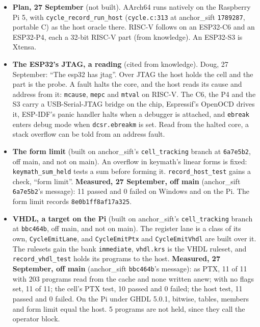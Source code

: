 \begin{enumerate}
\begin{itemize}
\begin{enumerate}
\begin{itemize}
\item \textbf{Plan, 27 September} (not built). AArch64 runs natively on the Raspberry Pi 5, with \texttt{cycle\_\allowbreak{}record\_\allowbreak{}run\_\allowbreak{}host} (\texttt{cycle.\allowbreak{}c:313} at anchor\_\allowbreak{}sift \texttt{1789287}, portable C) as the host oracle there. RISC-V follows on an ESP32-C6 and an ESP32-P4, each a 32-bit RISC-V part (from knowledge). An ESP32-S3 is Xtensa.
\item \textbf{The ESP32's JTAG, a reading} (cited from knowledge). Doug, 27 September: “The esp32 has jtag”. Over JTAG the host holds the cell and the part is the probe. A fault halts the core, and the host reads its cause and address from it: \texttt{mcause}, \texttt{mepc} and \texttt{mtval} on RISC-V. The C6, the P4 and the S3 carry a USB-Serial-JTAG bridge on the chip, Espressif's OpenOCD drives it, ESP-IDF's panic handler halts when a debugger is attached, and \texttt{ebreak} enters debug mode when \texttt{dcsr.ebreakm} is set. Read from the halted core, a stack overflow can be told from an address fault.
\item \textbf{The form limit} (built on anchor\_\allowbreak{}sift's \texttt{cell\_\allowbreak{}tracking} branch at \texttt{6a7e5b2}, off main, and not on main). An overflow in keymath's linear forms is fixed: \texttt{keymath\_\allowbreak{}sum\_\allowbreak{}held} tests a sum before forming it. \texttt{record\_\allowbreak{}host\_\allowbreak{}test} gains a check, “form limit”. \textbf{Measured, 27 September, off main} (anchor\_\allowbreak{}sift \texttt{6a7e5b2}'s message): 11 passed and 0 failed on Windows and on the Pi. The form limit records \texttt{8e0b1ff8af17a325}.
\item \textbf{VHDL, a target on the Pi} (built on anchor\_\allowbreak{}sift's \texttt{cell\_\allowbreak{}tracking} branch at \texttt{bbc464b}, off main, and not on main). The register lane is a class of its own, \texttt{CycleEmitLane}, and \texttt{CycleEmitPtx} and \texttt{CycleEmitVhdl} are built over it. The rulesets gain the bank \texttt{immediate}, \texttt{vhdl.\allowbreak{}krs} is the VHDL ruleset, and \texttt{record\_\allowbreak{}vhdl\_\allowbreak{}test} holds its programs to the host. \textbf{Measured, 27 September, off main} (anchor\_\allowbreak{}sift \texttt{bbc464b}'s message): as PTX, 11 of 11 with 203 programs read from the cache and none written anew; with no flags set, 11 of 11; the cell's PTX test, 10 passed and 0 failed; the host test, 11 passed and 0 failed. On the Pi under GHDL 5.0.1, bitwise, tables, members and form limit equal the host. 5 programs are not held, since they call the operator block.


\end{itemize}
\end{enumerate}
\end{itemize}
\end{enumerate}
